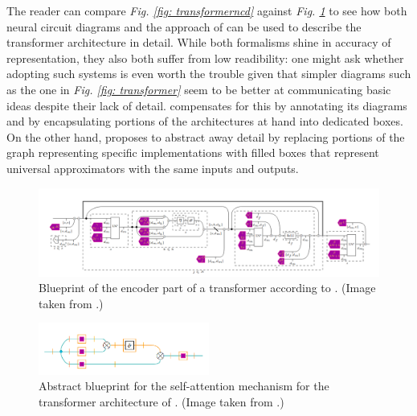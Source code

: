 \documentclass[11pt,a4paper,openright,twoside]{report}
\theoremstyle{plain}
\theoremstyle{definition}
\begin{document}
The reader can compare \textit{Fig. \ref{fig: transformerncd}} against \textit{Fig. \ref{fig: khatritransformer}} to see how both neural circuit diagrams and the approach of \cite{khatri2024anatomy} can be used to describe the transformer architecture in detail. While both formalisms shine in accuracy of representation, they also both suffer from low readibility: one might ask whether adopting such systems is even worth the trouble given that simpler diagrams such as the one in \textit{Fig. \ref{fig: transformer}} seem to be better at communicating basic ideas despite their lack of detail. \cite{abbott2023robust} compensates for this by annotating its diagrams and by encapsulating portions of the architectures at hand into dedicated boxes. On the other hand, \cite{khatri2024anatomy} proposes to abstract away detail by replacing portions of the graph representing specific implementations with filled boxes that represent universal approximators with the same inputs and outputs.

\begin{figure}[h]
  \begin{center}
    \includegraphics[width=\textwidth]{figures/khatri_transformer.png}
    \caption[Transformer blueprint according to \cite{khatri2024anatomy}]{Blueprint of the encoder part of a transformer according to \cite{khatri2024anatomy}. (Image taken from \cite{khatri2024anatomy}.)}
    \label{fig: khatritransformer}
  \end{center}
\end{figure}

\begin{figure}[h]
  \begin{center}
    \includegraphics[width=0.5\textwidth]{figures/khatri_attention.png}
    \caption[Abstract blueprint for self-attention]{Abstract blueprint for the self-attention mechanism for the transformer architecture of \cite{vaswani2017attention}. (Image taken from \cite{khatri2024anatomy}.)}
    \label{fig: khatriattention}
  \end{center}
\end{figure}
\end{document}
